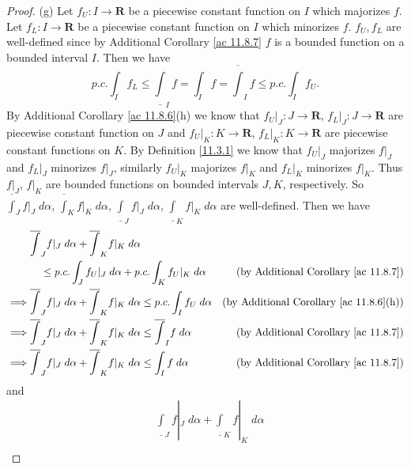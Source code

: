 \begin{proof}{(g)}
    Let \(f_U : I \to \mathbf{R}\) be a piecewise constant function on \(I\) which majorizes \(f\).
    Let \(f_L : I \to \mathbf{R}\) be a piecewise constant function on \(I\) which minorizes \(f\).
    \(f_U, f_L\) are well-defined since by Additional Corollary \ref{ac 11.8.7} \(f\) is a bounded function on a bounded interval \(I\).
    Then we have
    \[
        p.c. \int_I f_L \leq \underline{\int}_I f = \int_I f = \overline{\int}_I f \leq p.c. \int_I f_U.
    \]
    By Additional Corollary \ref{ac 11.8.6}(h) we know that \(f_U|_J : J \to \mathbf{R}\), \(f_L|_J : J \to \mathbf{R}\) are piecewise constant function on \(J\) and \(f_U|_K : K \to \mathbf{R}\), \(f_L|_K : K \to \mathbf{R}\) are piecewise constant functions on \(K\).
    By Definition \ref{11.3.1} we know that \(f_U|_J\) majorizes \(f|_J\) and \(f_L|_J\) minorizes \(f|_J\), similarly \(f_U|_K\) majorizes \(f|_K\) and \(f_L|_K\) minorizes \(f|_K\).
    Thus \(f|_J\), \(f|_K\) are bounded functions on bounded intervals \(J, K\), respectively.
    So \(\overline{\int}_J f|_J \; d \alpha\), \(\overline{\int}_K f|_K \; d \alpha\), \(\underline{\int}_J f|_J \; d \alpha\), \(\underline{\int}_K f|_K \; d \alpha\) are well-defined.
    Then we have
    \begin{align*}
                 & \overline{\int}_J f|_J \; d \alpha + \overline{\int}_K f|_K \; d \alpha                                                                                            \\
                 & \quad \leq p.c. \int_J f_U|_J \; d \alpha + p.c. \int_K f_U|_K \; d \alpha                                   & \text{(by Additional Corollary \ref{ac 11.8.7})}    \\
        \implies & \overline{\int}_J f|_J \; d \alpha + \overline{\int}_K f|_K \; d \alpha \leq p.c. \int_I f_U \; d \alpha     & \text{(by Additional Corollary \ref{ac 11.8.6}(h))} \\
        \implies & \overline{\int}_J f|_J \; d \alpha + \overline{\int}_K f|_K \; d \alpha \leq \overline{\int}_I f \; d \alpha & \text{(by Additional Corollary \ref{ac 11.8.7})}    \\
        \implies & \overline{\int}_J f|_J \; d \alpha + \overline{\int}_K f|_K \; d \alpha \leq \int_I f \; d \alpha            & \text{(by Additional Corollary \ref{ac 11.8.7})}
    \end{align*}
    and
    \begin{align*}
                 & \underline{\int}_J f|_J \; d \alpha + \underline{\int}_K f|_K \; d \alpha                                                                                             \\

\end{align*}
\end{proof}
